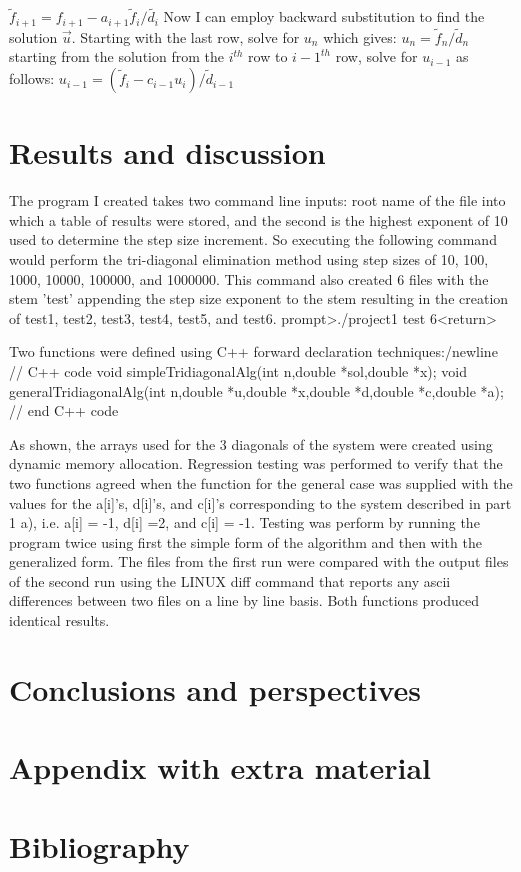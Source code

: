 \documentclass[11pt, oneside]{article}   	%
\begin{document}
\newline
$\tilde{f}_{i+1} = f_{i+1} - a_{i+1}\tilde{f}_i/\tilde{d_i}$\newline
\newline
Now I can employ backward substitution to find the solution $\vec{u}$. Starting with the last row, solve for $u_n$ which gives:\newline
\newline
$u_n = \tilde{f}_n/\tilde{d}_n$\newline
\newline
starting from the solution from the $i^{th}$  row to  ${i-1}^{th}$ row, solve for $u_{i-1}$ as follows:\newline
\newline
$u_{i-1}=(\tilde{f}_i -c_{i-1}u_i)/\tilde{d}_{i-1}$\newline
\newline
\section{Results and discussion}
The program I created takes two command line inputs: root name of the file into which a table of results were stored, and the second is the highest exponent of 10 used to determine the step size increment. So executing the following command would perform the tri-diagonal elimination method using step sizes of 10, 100, 1000, 10000, 100000, and 1000000. This command also created 6 files with the stem 'test' appending  the step size exponent to the stem resulting in the creation of test1, test2, test3, test4, test5, and test6. 
prompt>./project1 test 6<return>

Two functions were defined using C++ forward declaration techniques:/newline
// C++ code\newline
void simpleTridiagonalAlg(int n,double *sol,double *x);\newline
void generalTridiagonalAlg(int n,double *u,double *x,double *d,double *c,double *a);\newline
// end C++ code\newline

As shown, the arrays used for the 3 diagonals of the system were created using dynamic memory allocation. Regression testing was performed to verify that the two functions agreed when the function for the general case was supplied  with the values for the a[i]'s, d[i]'s, and c[i]'s corresponding to the system described in part 1 a), i.e. a[i] = -1, d[i] =2, and c[i] = -1. Testing was perform by running the program twice using first the simple form of the algorithm and then with the generalized form. The files from the first run were compared with the output files of the second run using the LINUX diff command that reports any ascii differences between two files on a line by line basis. Both functions produced identical results.


  
\section{Conclusions and perspectives}
\section{Appendix with extra material}
\section{Bibliography}
\end{document}
